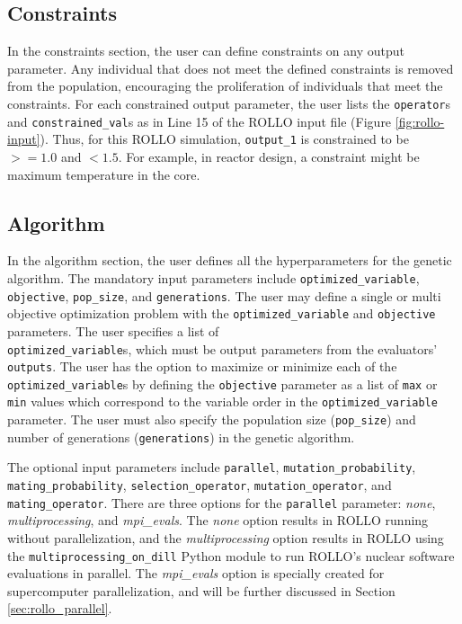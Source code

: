 \subsection{Constraints}
In the constraints section, the user can define constraints on any output parameter. 
Any individual that does not meet the defined constraints is removed from the 
population, encouraging the proliferation of individuals that meet the 
constraints. 
For each constrained output parameter, the user lists the \texttt{operator}s 
and \texttt{constrained\_val}s as in Line 15 of the \gls{ROLLO} input file 
(Figure \ref{fig:rollo-input}). 
Thus, for this \gls{ROLLO} simulation, \texttt{output\_1} is constrained to be 
$>= 1.0$ and $< 1.5$. 
For example, in reactor design, a constraint might be maximum temperature in the 
core.

\subsection{Algorithm}
In the algorithm section, the user defines all the hyperparameters for the 
genetic algorithm. 
The mandatory input parameters include \texttt{optimized\_variable}, 
\texttt{objective}, \texttt{pop\_size}, and \texttt{generations}.
The user may define a single or multi objective optimization problem with 
the \texttt{optimized\_variable} and \texttt{objective} parameters.
The user specifies a list of \\ \texttt{optimized\_variable}s, which must be
output parameters from the evaluators' \texttt{outputs}. 
The user has the option to maximize or minimize each of the 
\texttt{optimized\_variable}s by defining the \texttt{objective} parameter as 
a list of \texttt{max} or \texttt{min} values which correspond to the variable 
order in the \texttt{optimized\_variable} parameter.
The user must also specify the population size (\texttt{pop\_size}) and number 
of generations (\texttt{generations}) in the genetic algorithm. 

The optional input parameters include \texttt{parallel}, 
\texttt{mutation\_probability}, \\ \texttt{mating\_probability}, 
\texttt{selection\_operator}, \texttt{mutation\_operator}, 
and \texttt{mating\_operator}. 
There are three options for the \texttt{parallel} parameter: \textit{none}, 
\textit{multiprocessing}, and \textit{mpi\_evals}.
The \textit{none} option results in ROLLO running without parallelization, and
the \textit{multiprocessing} option results in ROLLO using the 
\texttt{multiprocessing\_on\_dill} Python module to run ROLLO's nuclear software 
evaluations in parallel.
The \textit{mpi\_evals} option is specially created for supercomputer 
parallelization, and will be further discussed in Section \ref{sec:rollo_parallel}.

